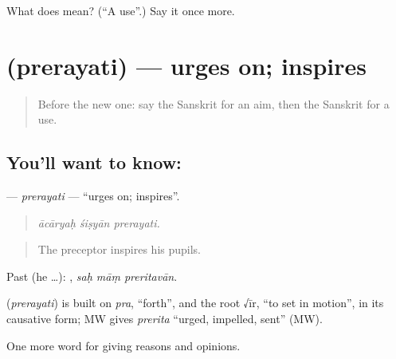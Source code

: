 \begin{tcolorbox}[breakable,colback=teal!4,colframe=teal!35!black,title={Before you move on}]
What does  mean? (\textquotedblleft{}A use\textquotedblright{}.) Say it once more.
\end{tcolorbox}
\section[\texorpdfstring{\sk{प्रेरयति} (prerayati)}{प्रेरयति (prerayati)}]{ (prerayati) — urges on; inspires}

\label{lesson:SA-C341-prerayati}



\begin{quote}
Before the new one: say the Sanskrit for an aim, then the Sanskrit for a use.
\end{quote}

\subsection*{You'll want to know: }
\textbf{} — \emph{prerayati} — \textquotedblleft{}urges on; inspires\textquotedblright{}.

\begin{quote}
  
\end{quote}

\begin{quote}
\emph{ācāryaḥ śiṣyān prerayati.}
\end{quote}

\begin{quote}
The preceptor inspires his pupils.
\end{quote}

Past (he …):   , \emph{saḥ māṃ preritavān}.

\begin{cousinweb}
\textbf{} (\emph{prerayati}) is built on \emph{pra}, \textquotedblleft{}forth\textquotedblright{}, and the root √īr, \textquotedblleft{}to set in motion\textquotedblright{}, in its causative form; MW gives \emph{prerita} \textquotedblleft{}urged, impelled, sent\textquotedblright{} (MW).
\end{cousinweb}

\begin{grammarlens}[title={What you've built}]
One more word for giving reasons and opinions.
\end{grammarlens}

